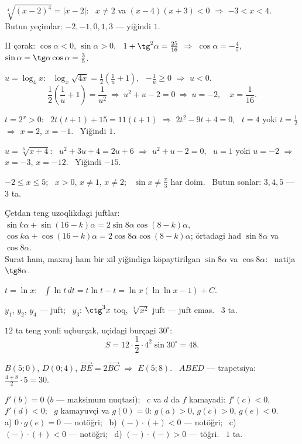$\sqrt[4]{(x-2)^4}=|x-2|$: \ $x\ne2$ va $(x-4)(x+3)<0$ $\Rightarrow$ $-3<x<4$.\\
Butun yeçimlar: $-2,-1,0,1,3$ — yiğindi $1$.

II çorak: $\cos\alpha<0$, $\sin\alpha>0$. \ $1+\tg^2\alpha=\frac{25}{16}$ $\Rightarrow$ $\cos\alpha=-\frac45$, \ $\sin\alpha=\tg\alpha\cos\alpha=\frac35$.

$u=\log_4x$: \ $\log_x\sqrt{4x}=\frac12\left(\frac1u+1\right)$, \ $-\frac1u\ge0$ $\Rightarrow$ $u<0$.
\[\frac12\left(\frac1u+1\right)=\frac1{u^2}\ \Rightarrow\ u^2+u-2=0\ \Rightarrow\ u=-2,\quad x=\frac1{16}.\]

$t=2^x>0$: \ $2t(t+1)+15=11(t+1)$ $\Rightarrow$ $2t^2-9t+4=0$, \ $t=4$ yoki $t=\frac12$ $\Rightarrow$ $x=2$, $x=-1$. \ Yiğindi $1$.

$u=\sqrt[3]{x+4}$: \ $u^2+3u+4=2u+6$ $\Rightarrow$ $u^2+u-2=0$, \ $u=1$ yoki $u=-2$ $\Rightarrow$ $x=-3$, $x=-12$. \ Yiğindi $-15$.

$-2\le x\le5$; \ $x>0$, $x\ne1$, $x\ne2$; \ $\sin x\ne\frac\pi3$ har doim. \ Butun sonlar: $3,4,5$ — $3$ ta.

Çetdan teng uzoqlikdagi juftlar: $\sin k\alpha+\sin(16-k)\alpha=2\sin8\alpha\cos(8-k)\alpha$, \ $\cos k\alpha+\cos(16-k)\alpha=2\cos8\alpha\cos(8-k)\alpha$; örtadagi had $\sin8\alpha$ va $\cos8\alpha$.\\
Surat ham, maxraj ham bir xil yiğindiga köpaytirilgan $\sin8\alpha$ va $\cos8\alpha$: \ natija $\tg8\alpha$.

$t=\ln x$: \ $\displaystyle\int\ln t\,dt=t\ln t-t=\ln x\left(\ln\ln x-1\right)+C$.

$y_1$, $y_2$, $y_4$ — juft; \ $y_3$: $\ctg^3x$ toq, $\sqrt[3]{x^2}$ juft — juft emas. \ $3$ ta.

$12$ ta teng yonli uçburçak, uçidagi burçagi $30^\circ$:
\[S=12\cdot\frac12\cdot4^2\sin30^\circ=48.\]

$B(5;0)$, $D(0;4)$, $\overrightarrow{BE}=2\overrightarrow{BC}$ $\Rightarrow$ $E(5;8)$. \ $ABED$ — trapetsiya: $\frac{4+8}2\cdot5=30$.

$f'(b)=0$ ($b$ — maksimum nuqtasi); \ $c$ va $d$ da $f$ kamayadi: $f'(c)<0$, $f'(d)<0$; \ $g$ kamayuvçi va $g(0)=0$: $g(a)>0$, $g(c)>0$, $g(e)<0$.\\
a) $0\cdot g(e)=0$ — notöğri; \ b) $(-)\cdot(+)<0$ — notöğri; \ c) $(-)\cdot(+)<0$ — notöğri; \ d) $(-)\cdot(-)>0$ — töğri. \ $1$ ta.

